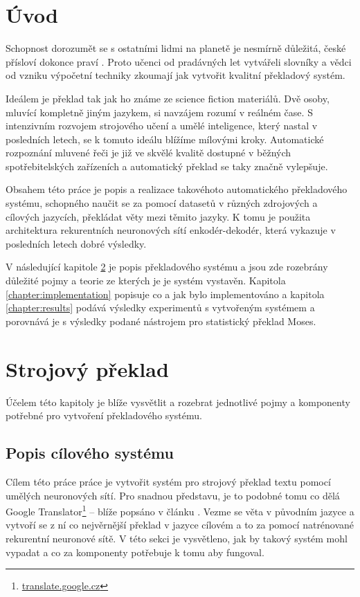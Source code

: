 \chapter{Úvod}
Schopnost dorozumět se s ostatními lidmi na planetě je nesmírně důležitá, české přísloví dokonce praví . Proto učenci od pradávných let vytvářeli slovníky a vědci od vzniku výpočetní techniky zkoumají jak vytvořit kvalitní překladový systém.

Ideálem je překlad tak jak ho známe ze science fiction materiálů. Dvě osoby, mluvící kompletně jiným jazykem, si navzájem rozumí v reálném čase. S intenzivním rozvojem strojového učení a umělé inteligence, který nastal v posledních letech, se k tomuto ideálu blížíme mílovými kroky. Automatické rozpoznání mluvené řeči je již ve skvělé kvalitě dostupné v běžných spotřebitelských zařízeních a automatický překlad se taky značně vylepšuje.

Obsahem této práce je popis a realizace takovéhoto automatického překladového systému, schopného naučit se za pomocí datasetů v různých zdrojových a cílových jazycích, překládat věty mezi těmito jazyky. K tomu je použita architektura rekurentních neuronových sítí enkodér-dekodér, která vykazuje v posledních letech dobré výsledky.

 V následující kapitole \ref{chapter:theory} je popis překladového systému a jsou zde rozebrány důležité pojmy a teorie ze kterých je je systém vystavěn. Kapitola \ref{chapter:implementation} popisuje co a jak bylo implementováno a kapitola \ref{chapter:results} podává výsledky experimentů s vytvořeným systémem a porovnává je s výsledky podané nástrojem pro statistický překlad Moses.


\chapter{Strojový překlad}\label{chapter:theory}
Účelem této kapitoly je blíže vysvětlit a rozebrat jednotlivé pojmy a komponenty potřebné pro vytvoření překladového systému.

\section{Popis cílového systému} \label{chapter:draft}
Cílem této práce práce je vytvořit systém pro strojový překlad textu pomocí umělých neuronových sítí. Pro snadnou představu, je to podobné tomu co dělá Google Translator\footnote{\url{translate.google.cz}} -- blíže popsáno v článku \cite{googleBridgingGap}. Vezme se věta v původním jazyce a vytvoří se z ní co nejvěrnější překlad v jazyce cílovém a to za pomocí natrénované rekurentní neuronové sítě. V této sekci je vysvětleno, jak by takový systém mohl vypadat a co za komponenty potřebuje k tomu aby fungoval.

